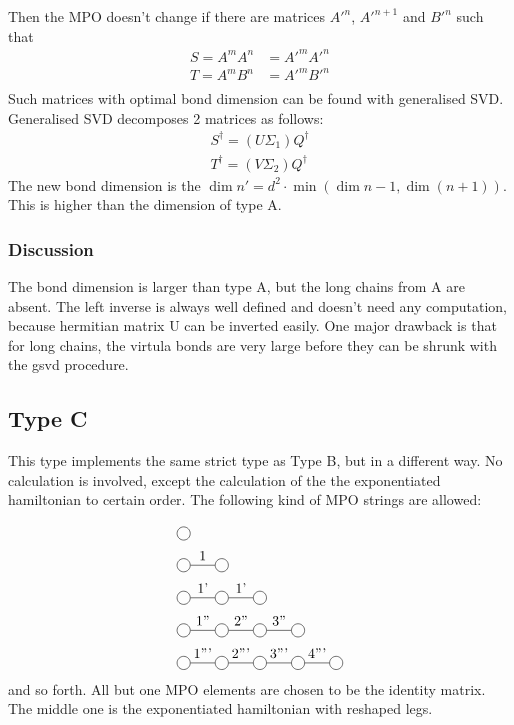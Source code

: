 Then the MPO doesn't change if there are matrices $A'^{n}$, $A'^{n+1}$ and $B'^{n}$ such that
\begin{equation}
    \begin{split}
        S=A^{m} A^{n} &= A'^{m} A'^{n} \\
        T=A^{m} B^{n} &= A'^{m} B'^{n} \\
    \end{split}
\end{equation}
Such matrices with optimal bond dimension can be found with generalised SVD. Generalised SVD decomposes 2 matrices as follows:
\begin{equation}
    \begin{split}
        S^{\dagger} = (U \Sigma_1) Q^{\dagger} \\
        T^{\dagger} = (V \Sigma_2) Q^{\dagger}
    \end{split}
\end{equation}
The new bond dimension is the $\dim{n'} =d^2 \cdot \min( \dim{n-1}, \dim (n+1) )$.  This is higher than the dimension of type A.

\subsubsection{Discussion}
The bond dimension is larger than type A, but the long chains from A are absent. The left inverse is always well defined and doesn't need any computation, because hermitian matrix U can be inverted easily. One major drawback is that for long chains, the virtula bonds are very large before they can be shrunk with the gsvd procedure.

\subsection{Type C}

This type implements the same strict type as Type B, but in a different way. No calculation is involved, except the calculation of the the exponentiated hamiltonian to certain order. The following kind of MPO strings are allowed:

\begin{equation}
    \begin{split}
        &\mpob{1}{ {,}  }{}{}{}{{,,}} \\
        &\mpob{2}{ {,"1",}  }{}{}{}{{,,}}\\
        &\mpob{3}{ {,"1'","1'",}  }{}{}{}{{,,,}}\\
        &\mpob{4}{ {,"1''","2''","3''",}  }{}{}{}{{,,,,,}}\\
        &\mpob{5}{ {,"1'''","2'''","3'''","4'''",}  }{}{}{}{{,,,,,}}\\
    \end{split}
\end{equation}
and so forth. All but one MPO elements are chosen to be the identity matrix. The middle one is the exponentiated hamiltonian with reshaped legs.

